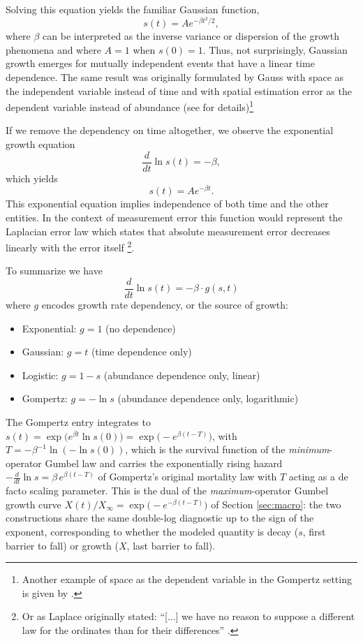 \documentclass{article}
\begin{document}
Solving this equation yields the familiar Gaussian function, 
\begin{equation}
  s(t) = A e^{ - \beta t^2 / 2},
\end{equation}
where $\beta$ can be interpreted as the inverse variance or dispersion of the growth phenomena and where $A=1$ when $s(0)=1$. Thus, not surprisingly, Gaussian growth emerges for mutually independent events that have a linear time dependence. The same result was originally formulated by Gauss with space as the independent variable instead of time and with spatial estimation error as the dependent variable instead of abundance \cite{gauss1857theory} (see \cite{stahl2006evolution} for details)\footnote{Another example of space as the dependent variable in the Gompertz setting is given by \citet{molski2003coherent}.}

If we remove the dependency on time altogether, we observe the exponential growth equation
\begin{equation}
  \frac{d}{dt}\ln s(t) = - \beta,
\end{equation}
which yields 
\begin{equation}
  s(t) = A e^{ - \beta t}.
\end{equation}
This exponential equation implies independence of both time and the other entities. In the context of measurement error this function would represent the Laplacian error law which states that absolute measurement error decreases linearly with the error itself \footnote{Or as Laplace originally stated: ``[...] we have no reason to suppose a different law for the ordinates than for their differences'' \cite{stahl2006evolution}.}. 

To summarize we have
\begin{equation}
\frac{d}{dt}\ln s(t) = -\beta \cdot g(s, t)
\end{equation}
where $g$ encodes growth rate dependency, or the source of growth:

\begin{itemize}
\item Exponential: $g = 1$ (no dependence)
\item Gaussian: $g = t$ (time dependence only)
\item Logistic: $g = 1 - s$ (abundance dependence only, linear)
\item Gompertz: $g = - \ln s$ (abundance dependence only, logarithmic)
\end{itemize}

The Gompertz entry integrates to $s(t) = \exp\!\big(e^{\beta t}\ln s(0)\big) = \exp\!\big(-e^{\beta(t - T)}\big)$, with $T = -\beta^{-1}\ln(-\ln s(0))$, which is the survival function of the \emph{minimum}-operator Gumbel law and carries the exponentially rising hazard $-\frac{d}{dt}\ln s = \beta\, e^{\beta(t-T)}$ of Gompertz's original mortality law with $T$ acting as a de facto scaling parameter. This is the dual of the \emph{maximum}-operator Gumbel growth curve $X(t)/X_\infty = \exp\!\big(-e^{-\beta(t - T)}\big)$ of Section \ref{sec:macro}: the two constructions share the same double-log diagnostic up to the sign of the exponent, corresponding to whether the modeled quantity is decay ($s$, first barrier to fall) or growth ($X$, last barrier to fall).
\end{document}
